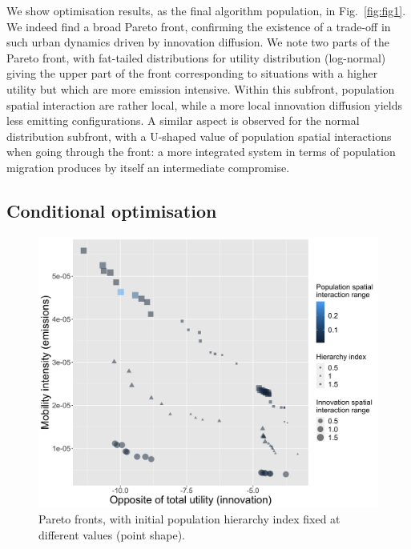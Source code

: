 \documentclass[final,5p,times,twocolumn,authoryear]{elsarticle}
\begin{document}
We show optimisation results, as the final algorithm population, in Fig.~\ref{fig:fig1}. We indeed find a broad Pareto front, confirming the existence of a trade-off in such urban dynamics driven by innovation diffusion. We note two parts of the Pareto front, with fat-tailed distributions for utility distribution (log-normal) giving the upper part of the front corresponding to situations with a higher utility but which are more emission intensive. Within this subfront, population spatial interaction are rather local, while a more local innovation diffusion yields less emitting configurations. A similar aspect is observed for the normal distribution subfront, with a U-shaped value of population spatial interactions when going through the front: a more integrated system in terms of population migration produces by itself an intermediate compromise.






\subsection{Conditional optimisation}




\begin{figure}
	\centering
	\includegraphics[width=\linewidth]{figures/Fig2.png}
	\caption{Pareto fronts, with initial population hierarchy index fixed at different values (point shape).\label{fig:fig2}}
\end{figure}
\end{document}
